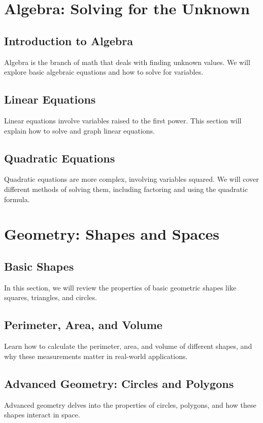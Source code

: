 \documentclass{book}
\begin{document}
\chapter{Algebra: Solving for the Unknown}
\section{Introduction to Algebra}
Algebra is the branch of math that deals with finding unknown values. We will explore basic algebraic equations and how to solve for variables.

\section{Linear Equations}
Linear equations involve variables raised to the first power. This section will explain how to solve and graph linear equations.

\section{Quadratic Equations}
Quadratic equations are more complex, involving variables squared. We will cover different methods of solving them, including factoring and using the quadratic formula.

\chapter{Geometry: Shapes and Spaces}
\section{Basic Shapes}
In this section, we will review the properties of basic geometric shapes like squares, triangles, and circles.

\section{Perimeter, Area, and Volume}
Learn how to calculate the perimeter, area, and volume of different shapes, and why these measurements matter in real-world applications.

\section{Advanced Geometry: Circles and Polygons}
Advanced geometry delves into the properties of circles, polygons, and how these shapes interact in space.
\end{document}
